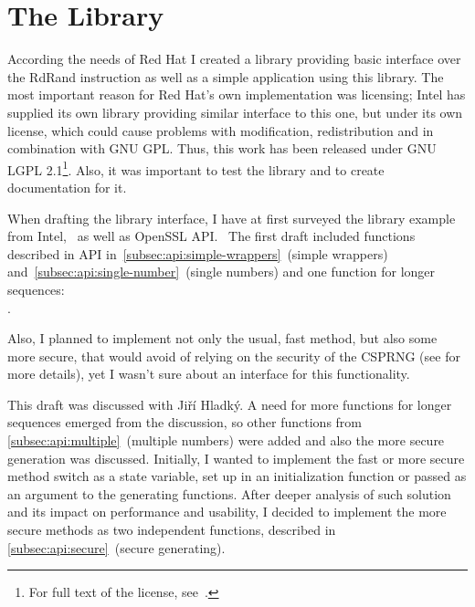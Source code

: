 \chapter{The Library}\label{chap:library}
\par{
According the needs of Red Hat I created a library providing basic interface over the RdRand instruction as well as a simple application using this library. The most important reason for Red Hat's own implementation was licensing; Intel has supplied its own library providing similar interface to this one, but under its own license, which could cause problems with modification, redistribution and in combination with GNU GPL. Thus, this work has been released under GNU LGPL 2.1\footnote{For full text of the license, see~\cite{GNULGPL}.}. Also, it was important to test the library and to create documentation for it.
}

\par{
When drafting the library interface, I have at first surveyed the library example from Intel,~\cite{IntelDRNGGuide} as well as OpenSSL API.~\cite{OpenSSLAPI} The first draft included functions described in API in~\ref{subsec:api:simple-wrappers}~(simple wrappers) and~\ref{subsec:api:single-number}~(single numbers) and one function for longer sequences: \\. 
}

\par{
Also, I planned to implement not only the usual, fast method, but also some more secure, that would avoid of relying on the security of the CSPRNG (see  for more details), yet I wasn't sure about an interface for this functionality.
}

\par{
This draft was discussed with Jiří Hladký. A need for more functions for longer sequences emerged from the discussion, so other functions from \ref{subsec:api:multiple}~(multiple numbers) were added and also the more secure generation was discussed. Initially, I wanted to implement the fast or more secure method switch as a state variable, set up in an initialization function or passed as an argument to the generating functions. After deeper analysis of such solution and its impact on performance and usability, I decided to implement the more secure methods as two independent functions, described in \ref{subsec:api:secure}~(secure generating).  
}

